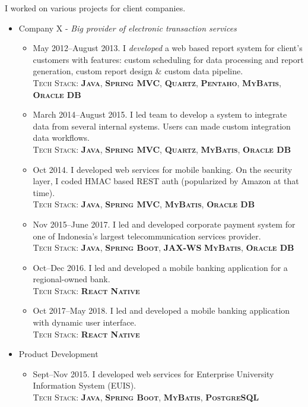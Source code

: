 \documentclass[11pt,a4paper,sans]{moderncv} %
\begin{document}
{
I worked on various projects for client companies.
\begin{itemize}
  \item Company X - \textit{Big provider of electronic transaction services} 
    \begin{itemize}
      \item May 2012--August 2013. I \textit{developed} a web based report system for client's customers with features: custom scheduling for data processing and report generation, custom report design \& custom data pipeline.\\ \textsc{Tech Stack: \textbf{Java}, \textbf{Spring MVC}, \textbf{Quartz}, \textbf{Pentaho}, \textbf{MyBatis}, \textbf{Oracle DB}}
      \item March 2014--August 2015. I led team to develop a system to integrate data from several internal systems. Users can made custom integration data workflows.\\ \textsc{Tech Stack: \textbf{Java}, \textbf{Spring MVC}, \textbf{Quartz}, \textbf{MyBatis}, \textbf{Oracle DB}}
      \item Oct 2014. I developed web services for mobile banking. On the security layer, I coded HMAC based REST auth (popularized by Amazon at that time).\\ \textsc{Tech Stack: \textbf{Java}, \textbf{Spring MVC}, \textbf{MyBatis}, \textbf{Oracle DB}}
      \item Nov 2015--June 2017. I led and developed corporate payment system for one of Indonesia's largest telecommunication services provider.\\ \textsc{Tech Stack: \textbf{Java}, \textbf{Spring Boot}, \textbf{JAX-WS} \textbf{MyBatis}, \textbf{Oracle DB}}
      \item Oct--Dec 2016. I led and developed a mobile banking application for a regional-owned bank.\\ \textsc{Tech Stack: \textbf{React Native}}
      \item Oct 2017--May 2018. I led and developed a mobile banking application with dynamic user interface.\\ \textsc{Tech Stack: \textbf{React Native}}
      \end{itemize}
  \item Product Development
  \begin{itemize}
      \item Sept--Nov 2015. I developed web services for Enterprise University Information System (EUIS).\\ \textsc{Tech Stack: \textbf{Java}, \textbf{Spring Boot}, \textbf{MyBatis}, \textbf{PostgreSQL}}

\end{itemize}
\end{itemize}}
\end{document}
